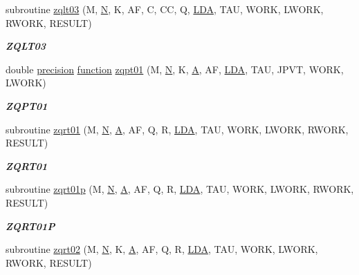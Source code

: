 \begin{DoxyCompactItemize}
subroutine \hyperlink{group__complex16__lin_ga0b09867599fc3188f403b8713c1f1830}{zqlt03} (M, \hyperlink{polmisc_8c_a0240ac851181b84ac374872dc5434ee4}{N}, K, A\+F, C, C\+C, Q, \hyperlink{example__user_8c_ae946da542ce0db94dced19b2ecefd1aa}{L\+D\+A}, T\+A\+U, W\+O\+R\+K, L\+W\+O\+R\+K, R\+W\+O\+R\+K, R\+E\+S\+U\+L\+T)
\begin{DoxyCompactList}\small\item\em {\bfseries Z\+Q\+L\+T03} \end{DoxyCompactList}\item 
double \hyperlink{numinquire_8h_a2c8e616467665d0b2814d4c1589ba74e}{precision} \hyperlink{afunc_8m_a7b5e596df91eadea6c537c0825e894a7}{function} \hyperlink{group__complex16__lin_ga26fcf841c714a1ad6781cd252892f32b}{zqpt01} (M, \hyperlink{polmisc_8c_a0240ac851181b84ac374872dc5434ee4}{N}, K, \hyperlink{classA}{A}, A\+F, \hyperlink{example__user_8c_ae946da542ce0db94dced19b2ecefd1aa}{L\+D\+A}, T\+A\+U, J\+P\+V\+T, W\+O\+R\+K, L\+W\+O\+R\+K)
\begin{DoxyCompactList}\small\item\em {\bfseries Z\+Q\+P\+T01} \end{DoxyCompactList}\item 
subroutine \hyperlink{group__complex16__lin_ga64f700e8682490333d41b9afb0728e36}{zqrt01} (M, \hyperlink{polmisc_8c_a0240ac851181b84ac374872dc5434ee4}{N}, \hyperlink{classA}{A}, A\+F, Q, R, \hyperlink{example__user_8c_ae946da542ce0db94dced19b2ecefd1aa}{L\+D\+A}, T\+A\+U, W\+O\+R\+K, L\+W\+O\+R\+K, R\+W\+O\+R\+K, R\+E\+S\+U\+L\+T)
\begin{DoxyCompactList}\small\item\em {\bfseries Z\+Q\+R\+T01} \end{DoxyCompactList}\item 
subroutine \hyperlink{group__complex16__lin_gaf17dda263250dbb5cea8e3ce1413dbb3}{zqrt01p} (M, \hyperlink{polmisc_8c_a0240ac851181b84ac374872dc5434ee4}{N}, \hyperlink{classA}{A}, A\+F, Q, R, \hyperlink{example__user_8c_ae946da542ce0db94dced19b2ecefd1aa}{L\+D\+A}, T\+A\+U, W\+O\+R\+K, L\+W\+O\+R\+K, R\+W\+O\+R\+K, R\+E\+S\+U\+L\+T)
\begin{DoxyCompactList}\small\item\em {\bfseries Z\+Q\+R\+T01\+P} \end{DoxyCompactList}\item 
subroutine \hyperlink{group__complex16__lin_ga5009236de87a2dccfca9a6de334feb1e}{zqrt02} (M, \hyperlink{polmisc_8c_a0240ac851181b84ac374872dc5434ee4}{N}, K, \hyperlink{classA}{A}, A\+F, Q, R, \hyperlink{example__user_8c_ae946da542ce0db94dced19b2ecefd1aa}{L\+D\+A}, T\+A\+U, W\+O\+R\+K, L\+W\+O\+R\+K, R\+W\+O\+R\+K, R\+E\+S\+U\+L\+T)

\end{DoxyCompactItemize}
